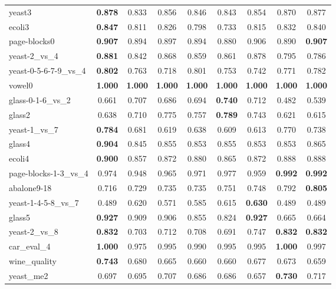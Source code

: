 \begin{table}[htbp]
{\begin{tabular}{lcccccccc}
			yeast3 & \textbf{0.878} & 0.833 & 0.856 & 0.846 & 0.843 & 0.854 & 0.870 & 0.877 \\
			ecoli3 & \textbf{0.847} & 0.811 & 0.826 & 0.798 & 0.733 & 0.815 & 0.832 & 0.840 \\
			page-blocks0 & \textbf{0.907} & 0.894 & 0.897 & 0.894 & 0.880 & 0.906 & 0.890 & \textbf{0.907} \\
			yeast-2\_vs\_4 & \textbf{0.881} & 0.842 & 0.868 & 0.859 & 0.861 & 0.878 & 0.795 & 0.786 \\
			yeast-0-5-6-7-9\_vs\_4 & \textbf{0.802} & 0.763 & 0.718 & 0.801 & 0.753 & 0.742 & 0.771 & 0.782 \\
			vowel0 & \textbf{1.000} & \textbf{1.000} & \textbf{1.000} & \textbf{1.000} & \textbf{1.000} & \textbf{1.000} & \textbf{1.000} & \textbf{1.000} \\
			glass-0-1-6\_vs\_2 & 0.661 & 0.707 & 0.686 & 0.694 & \textbf{0.740} & 0.712 & 0.482 & 0.539 \\
			glass2 & 0.638 & 0.710 & 0.775 & 0.757 & \textbf{0.789} & 0.743 & 0.621 & 0.615 \\
			yeast-1\_vs\_7 & \textbf{0.784} & 0.681 & 0.619 & 0.638 & 0.609 & 0.613 & 0.770 & 0.738 \\
			glass4 & \textbf{0.904} & 0.845 & 0.855 & 0.853 & 0.855 & 0.853 & 0.853 & 0.865 \\
			ecoli4 & \textbf{0.900} & 0.857 & 0.872 & 0.880 & 0.865 & 0.872 & 0.888 & 0.888 \\
			page-blocks-1-3\_vs\_4 & 0.974 & 0.948 & 0.965 & 0.971 & 0.977 & 0.959 & \textbf{0.992} & \textbf{0.992} \\
			abalone9-18 & 0.716 & 0.729 & 0.735 & 0.735 & 0.751 & 0.748 & 0.792 & \textbf{0.805} \\
			yeast-1-4-5-8\_vs\_7 & 0.489 & 0.620 & 0.571 & 0.585 & 0.615 & \textbf{0.630} & 0.489 & 0.489 \\
			glass5 & \textbf{0.927} & 0.909 & 0.906 & 0.855 & 0.824 & \textbf{0.927} & 0.665 & 0.664 \\
			yeast-2\_vs\_8 & \textbf{0.832} & 0.703 & 0.712 & 0.708 & 0.691 & 0.747 & \textbf{0.832} & \textbf{0.832} \\
			car\_eval\_4 & \textbf{1.000} & 0.975 & 0.995 & 0.990 & 0.995 & 0.995 & \textbf{1.000} & 0.997 \\
			wine\_quality & \textbf{0.743} & 0.680 & 0.665 & 0.660 & 0.660 & 0.677 & 0.673 & 0.659 \\
			yeast\_me2 & 0.697 & 0.695 & 0.707 & 0.686 & 0.686 & 0.657 & \textbf{0.730} & 0.717 \\

\end{tabular}}
\end{table}
